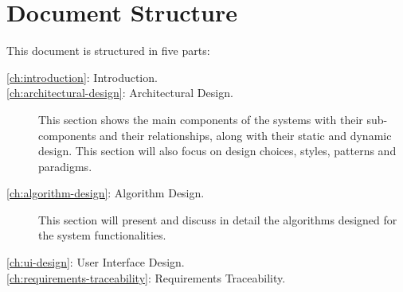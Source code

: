 \section{Document Structure}
\label{sec:structure}

This document is structured in five parts:
\begin{description}
\item[\autoref{ch:introduction}: Introduction.] %
\item[\autoref{ch:architectural-design}: Architectural Design.] This section shows the main components of the systems with their sub-components and their relationships, along with their static and dynamic design. This section will also focus on design choices, styles, patterns and paradigms.
\item[\autoref{ch:algorithm-design}: Algorithm Design.] This section will present and discuss in detail the algorithms designed for the system functionalities.
\item[\autoref{ch:ui-design}: User Interface Design.] %
\item[\autoref{ch:requirements-traceability}: Requirements Traceability.] %
\end{description}
